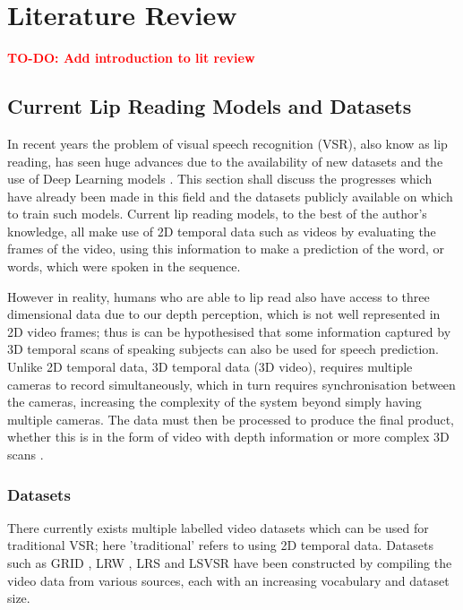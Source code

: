 \documentclass[12pt]{report}
\begin{document}
\chapter{Literature Review}

\textcolor{red}{\textbf{TO-DO: Add introduction to lit review}}

\section{Current Lip Reading Models and Datasets}

In recent years the problem of visual speech recognition (VSR), also know as lip reading, has seen huge advances due to the availability of new datasets and the use of Deep Learning models \cite{Chung2016, Chung2017, Shillingford2018}.
This section shall discuss the progresses which have already been made in this field and the datasets publicly available on which to train such models.
Current lip reading models, to the best of the author's knowledge, all make use of 2D temporal data such as videos by evaluating the frames of the video, using this information to make a prediction of the word, or words, which were spoken in the sequence.

However in reality, humans who are able to lip read also have access to three dimensional data due to our depth perception, which is not well represented in 2D video frames; thus is can be hypothesised that some information captured by 3D temporal scans of speaking subjects can also be used for speech prediction.
Unlike 2D temporal data, 3D temporal data (3D video), requires multiple cameras to record simultaneously, which in turn requires synchronisation between the cameras, increasing the complexity of the system beyond simply having multiple cameras.
The data must then be processed to produce the final product, whether this is in the form of video with depth information or more complex 3D scans \cite{Li2017}.

\subsection{Datasets}
There currently exists multiple labelled video datasets which can be used for traditional VSR; here 'traditional' refers to using 2D temporal data.
Datasets such as GRID \cite{Cooke2006}, LRW \cite{Chung2016}, LRS \cite{Chung2017} and LSVSR \cite{Shillingford2018} have been constructed by compiling the video data from various sources, each with an increasing vocabulary and dataset size.
\end{document}
